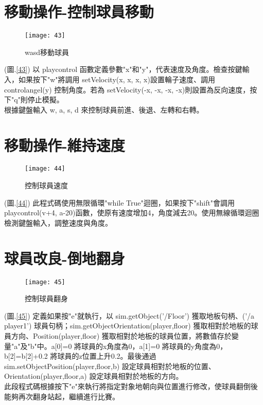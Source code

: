\section{移動操作-控制球員移動}
\begin{figure}[hbt!]
\begin{center}
\texttt{[image: 43]}
\caption{\Large wasd移動球員}\label{fig.43}
\end{center}
\end{figure}
(圖.\ref{43}) 以 playcontrol 函數定義參數"x"和"y"，代表速度及角度。檢查按鍵輸入，如果按下"w"將調用 setVelocity(x, x, x, x)設置輪子速度、調用 controlangel(y) 控制角度。若為 setVelocity(-x, -x, -x, -x)則設置為反向速度，按下"q"則停止模擬。\\
  根據鍵盤輸入 w, a, s, d 來控制球員前進、後退、左轉和右轉。\\
\newpage
\section{移動操作-維持速度}
\begin{figure}[hbt!]
\begin{center}
\texttt{[image: 44]}
\caption{\Large 控制球員速度}\label{fig.44}
\end{center}
\end{figure}
(圖.\ref{44}) 此程式碼使用無限循環"while True"迴圈，如果按下"shift"會調用 playcontrol(v+4, a-20)函數，使原有速度增加4，角度減去20。使用無線循環迴圈檢測鍵盤輸入，調整速度與角度。\\
\section{球員改良-倒地翻身}
\begin{figure}[hbt!]
\begin{center}
\texttt{[image: 45]}
\caption{\Large 控制球員翻身}\label{fig.45}
\end{center}
\end{figure}
(圖.\ref{45}) 定義如果按"e"就執行，以 sim.getObject('/Floor') 獲取地板句柄、('/a player1') 球員句柄；sim.getObjectOrientation(player,floor) 獲取相對於地板的球員方向、Position(player,floor) 獲取相對於地板的球員位置，將數值存於變量"a"及"b"中。a[0]=0 將球員的x角度為0，a[1]=0 將球員的y角度為0，b[2]=b[2]+0.2 將球員的z位置上升0.2。最後通過 sim.setObjectPosition(player,floor,b) 設定球員相對於地板的位置、Orientation(player,floor,a) 設定球員相對於地板的方向。\\
  此段程式碼根據按下"e"來執行將指定對象地朝向與位置進行修改，使球員翻倒後能夠再次翻身站起，繼續進行比賽。\\
\renewcommand{\baselinestretch}{1} %
